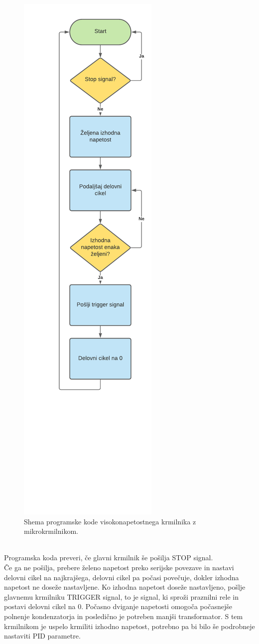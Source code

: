 \documentclass[a4paper,twoside,openright,12pt,Slovene]{book}
\begin{document}
	\begin{figure}[H]
    \centering
    \includegraphics[width=0.35\columnwidth]{Sheme/KrmilnikzuCShema.pdf}
    \caption{\label{KrmilnikzuCShema} Shema programske kode visokonapetostnega krmilnika z mikrokrmilnikom.}
	\end{figure}
	
~\\Programska koda preveri, če glavni krmilnik še pošilja STOP signal. 
~\\Če ga ne pošilja, prebere želeno napetost preko serijske povezave in nastavi delovni cikel na najkrajšega, delovni cikel pa počasi povečuje, dokler izhodna napetost ne doseže nastavljene. Ko izhodna napetost doseže nastavljeno, pošlje glavnemu krmilniku TRIGGER signal, to je signal, ki sproži praznilni rele in postavi delovni cikel na 0. Počasno dviganje napetosti omogoča počasnejše polnenje kondenzatorja in posledično je potreben manjši transformator. S tem krmilnikom je uspelo krmiliti izhodno napetost, potrebno pa bi bilo še podrobneje nastaviti PID parametre.
\end{document}
